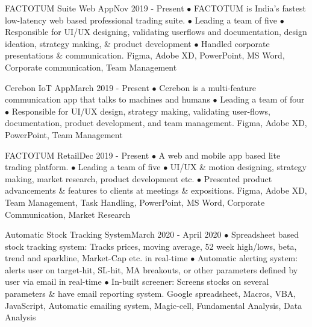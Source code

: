 %
%
%

\begin{projects}
  \project
    {FACTOTUM Suite Web App}{Nov 2019 - Present}
    {}
    {$\bullet$ FACTOTUM is India's fastest low-latency web based professional trading suite. $\bullet$ Leading a team of five $\bullet$ Responsible for UI/UX designing, validating userflows and documentation, design ideation, strategy making, \& product development $\bullet$ Handled corporate presentations \& communication.}
    {Figma, Adobe XD, PowerPoint, MS Word, Corporate communication, Team Management}
    
    \project
    {Cerebon IoT App}{March 2019 - Present}
    {}
    {$\bullet$ Cerebon is a multi-feature communication app that talks to machines and humans $\bullet$ Leading a team of four $\bullet$ Responsible for UI/UX design, strategy making, validating user-flows, documentation, product development, and team management.}
    {Figma, Adobe XD, PowerPoint, Team Management}
    
  \project
    {FACTOTUM Retail}{Dec 2019 - Present}
    { }
    {$\bullet$ A web and mobile app based lite trading platform. $\bullet$ Leading a team of five $\bullet$ UI/UX \& motion designing, strategy making, market research, product development etc. $\bullet$ Presented product advancements \& features to clients at meetings \& expositions.}
    {Figma, Adobe XD, Team Management, Task Handling, PowerPoint, MS Word, Corporate Communication, Market Research}
    
    \project
    {Automatic Stock Tracking System}{March 2020 - April 2020}
    {}
    {$\bullet$ Spreadsheet based stock tracking system: Tracks prices, moving average, 52 week high/lows, beta, trend and sparkline, Market-Cap etc. in real-time $\bullet$ Automatic alerting system: alerts user on target-hit, SL-hit, MA breakouts, or other parameters defined by user via email in real-time $\bullet$ In-built screener: Screens stocks on several parameters \& have email reporting system.}
    {Google spreadsheet, Macros, VBA, JavaScript, Automatic emailing system, Magic-cell, Fundamental Analysis, Data Analysis}
    

\end{projects}
